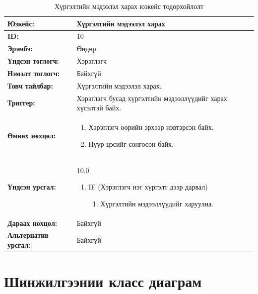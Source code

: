 \begin{table}[H]
    \caption{Хүргэлтийн мэдээлэл харах юзкейс тодорхойлолт}
    \begin{tabular}{|l|p{9cm}|}
		\hline
		{\bfseries Юзкейс:} & Хүргэлтийн мэдээлэл харах \\\hline
		{\bfseries ID:} & 10 \\\hline
		{\bfseries Эрэмбэ:} & Өндөр \\\hline
		{\bfseries Үндсэн тоглогч:} & Хэрэглэгч \\\hline
		{\bfseries Нэмэлт тоглогч:} & Байхгүй \\\hline
		{\bfseries Товч тайлбар:} & Хүргэлтийн мэдээлэл харах. \\\hline
		{\bfseries Триггер:} & Хэрэглэгч бусад хүргэлтийн мэдээллүүдийг харах хүсэлтэй байх. \\\hline
		{\bfseries Өмнөх нөхцөл:} &
		    \begin{enumerate}[nosep]
		        \item Хэрэглэгч өөрийн эрхээр нэвтэрсэн байх.
		        \item Нүүр цэсийг сонгосон байх.
		    \end{enumerate}
		\\\hline
		{\bfseries Үндсэн урсгал:} &
			10.0
			\begin{enumerate}[nosep]
				\item IF (Хэрэглэгч нэг хүргэлт дээр дарвал)
				    \begin{enumerate}[nosep]
		                \item Хүргэлтийн мэдээллүүдийг харуулна.
				    \end{enumerate}
			\end{enumerate}
		\\\hline
		{\bfseries Дараах нөхцөл:} & Байхгүй \\\hline
		{\bfseries Альтернатив урсгал:} & Байхгүй \\\hline
    \end{tabular}
\end{table}


\section{Шинжилгээнии класс диаграм}

